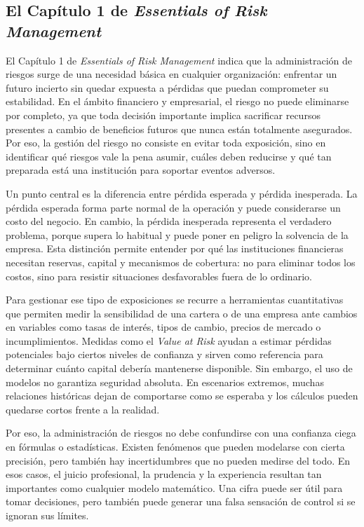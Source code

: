 \subsection{El Cap\'itulo 1 de \textit{Essentials of Risk Management}}

El Cap\'itulo 1 de \textit{Essentials of Risk Management} indica que la administraci\'on de riesgos surge de una necesidad b\'asica en cualquier organizaci\'on: enfrentar un futuro incierto sin quedar expuesta a p\'erdidas que puedan comprometer su estabilidad. En el \'ambito financiero y empresarial, el riesgo no puede eliminarse por completo, ya que toda decisi\'on importante implica sacrificar recursos presentes a cambio de beneficios futuros que nunca est\'an totalmente asegurados. Por eso, la gesti\'on del riesgo no consiste en evitar toda exposici\'on, sino en identificar qu\'e riesgos vale la pena asumir, cu\'ales deben reducirse y qu\'e tan preparada est\'a una instituci\'on para soportar eventos adversos.

Un punto central es la diferencia entre p\'erdida esperada y p\'erdida inesperada. La p\'erdida esperada forma parte normal de la operaci\'on y puede considerarse un costo del negocio. En cambio, la p\'erdida inesperada representa el verdadero problema, porque supera lo habitual y puede poner en peligro la solvencia de la empresa. Esta distinci\'on permite entender por qu\'e las instituciones financieras necesitan reservas, capital y mecanismos de cobertura: no para eliminar todos los costos, sino para resistir situaciones desfavorables fuera de lo ordinario.

Para gestionar ese tipo de exposiciones se recurre a herramientas cuantitativas que permiten medir la sensibilidad de una cartera o de una empresa ante cambios en variables como tasas de inter\'es, tipos de cambio, precios de mercado o incumplimientos. Medidas como el \textit{Value at Risk} ayudan a estimar p\'erdidas potenciales bajo ciertos niveles de confianza y sirven como referencia para determinar cu\'anto capital deber\'ia mantenerse disponible. Sin embargo, el uso de modelos no garantiza seguridad absoluta. En escenarios extremos, muchas relaciones hist\'oricas dejan de comportarse como se esperaba y los c\'alculos pueden quedarse cortos frente a la realidad.

Por eso, la administraci\'on de riesgos no debe confundirse con una confianza ciega en f\'ormulas o estad\'isticas. Existen fen\'omenos que pueden modelarse con cierta precisi\'on, pero tambi\'en hay incertidumbres que no pueden medirse del todo. En esos casos, el juicio profesional, la prudencia y la experiencia resultan tan importantes como cualquier modelo matem\'atico. Una cifra puede ser \'util para tomar decisiones, pero tambi\'en puede generar una falsa sensaci\'on de control si se ignoran sus l\'imites.

